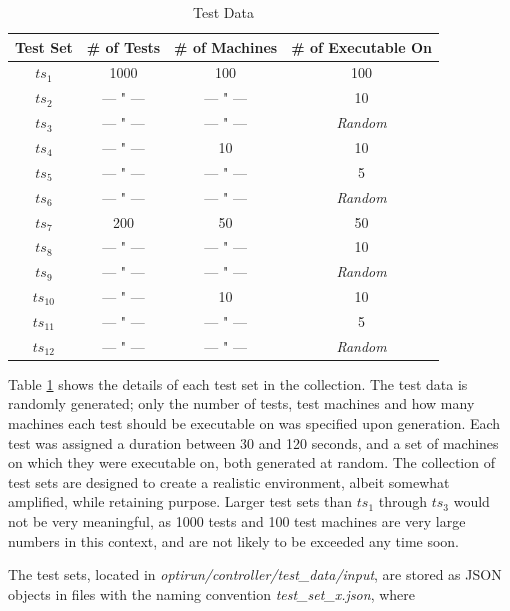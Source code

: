 \begin{table}[h]
  \begin{tabular}{cccc}
    \hline
    \textbf{Test Set} & \textbf{\# of Tests} & \textbf{\# of Machines} & \textbf{\# of Executable On}\\
    \hline
    $ts_{1}$   &  1000        &   100        &   100\\
    $ts_{2}$   &  --- " ---   &   --- " ---  &   10\\
    $ts_{3}$   &  --- " ---   &   --- " ---  &   \emph{Random}\\
    \hline
    $ts_{4}$   &  --- " ---   &   10          &   10\\
    $ts_{5}$   &  --- " ---   &   --- " ---   &   5\\
    $ts_{6}$   &  --- " ---   &   --- " ---   &   \emph{Random}\\
    \hline
    $ts_{7}$   &   200        &   50          &   50\\
    $ts_{8}$   &   --- " ---  &   --- " ---   &   10\\
    $ts_{9}$   &   --- " ---  &   --- " ---   &   \emph{Random}\\
    \hline
    $ts_{10}$  &   --- " ---  &   10          &   10\\
    $ts_{11}$  &   --- " ---  &   --- " ---   &   5\\
    $ts_{12}$  &   --- " ---  &   --- " ---   &   \emph{Random}\\
    \hline
  \end{tabular}
  \centering
  \caption{Test Data}
  \label{test_data}
\end{table}

Table \ref{test_data} shows the details of each test set in the collection. The test data is randomly generated; only the number of tests, test machines and how many machines each test should be executable on was specified upon generation. Each test was assigned a duration between 30 and 120 seconds, and a set of machines on which they were executable on, both generated at random. The collection of test sets are designed to create a realistic environment, albeit somewhat amplified, while retaining purpose. Larger test sets than $ts_1$ through $ts_3$ would not be very meaningful, as 1000 tests and 100 test machines are very large numbers in this context, and are not likely to be exceeded any time soon.

The test sets, located in \emph{optirun/controller/test\_data/input}, are stored as JSON objects in files with the naming convention \emph{{test\_set\_x.json}}, where


